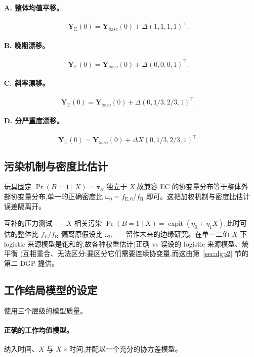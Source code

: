 \documentclass[11pt]{article}
\newcommand{\R}{\mathrm{R}}
\newcommand{\E}{\mathrm{E}}
\begin{document}
\paragraph{A. 整体均值平移。}
\[
\bm Y_{\E}(0)=\bm Y_{\mathrm{base}}(0)+\Delta(1,1,1,1)^{\top}.
\tag{29}
\]

\paragraph{B. 晚期漂移。}
\[
\bm Y_{\E}(0)=\bm Y_{\mathrm{base}}(0)+\Delta(0,0,0,1)^{\top}.
\tag{30}
\]

\paragraph{C. 斜率漂移。}
\[
\bm Y_{\E}(0)=\bm Y_{\mathrm{base}}(0)+\Delta(0,1/3,2/3,1)^{\top}.
\tag{31}
\]

\paragraph{D. 分严重度漂移。}
\[
\bm Y_{\E}(0)=\bm Y_{\mathrm{base}}(0)+\Delta X(0,1/3,2/3,1)^{\top}.
\tag{32}
\]

\subsection{污染机制与密度比估计}

玩具固定 $\Pr(B=1\mid X)=\pi_B$ 独立于 $X$,故兼容 EC 的协变量分布等于整体外部协变量分布,单一的正确密度比 $\omega_0=f_{\E,0}/f_{\R}$ 即可。这把加权机制与密度比估计误差隔离开。

互补的压力测试——$X$ 相关污染 $\Pr(B=1\mid X)=\operatorname{expit}(\eta_0+\eta_1X)$,此时可估的整体比 $f_{\E}/f_{\R}$ 偏离原假设比 $\omega_0$——留作未来的边缘研究。在单一二值 $X$ 下 logistic 来源模型是饱和的,故各种权重估计(正确 vs 误设的 logistic 来源模型、熵平衡 \citep{hainmueller2012})互相重合、无法区分;要区分它们需要连续协变量,而这由第~\ref{sec:dgp2} 节的第二 DGP 提供。

\subsection{工作结局模型的设定}

使用三个层级的模型质量。

\paragraph{正确的工作均值模型。}
纳入时间、$X$ 与 $X\times$时间,并配以一个充分的协方差模型。
\end{document}
